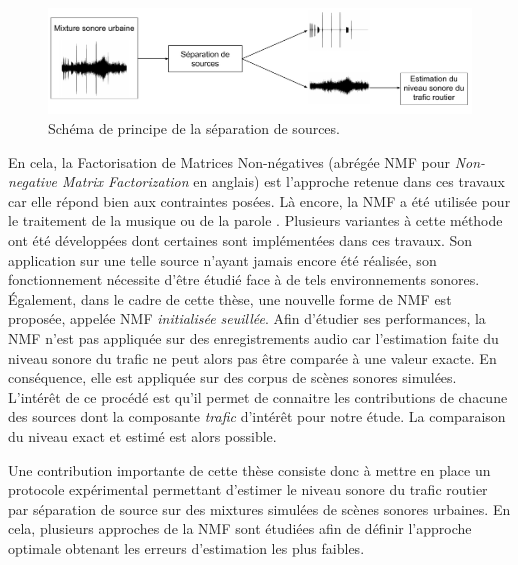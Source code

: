 \begin{figure}[h]
\centering
\includegraphics[width=\linewidth]{./figures/autres/schema_source_separation_FR.pdf}
\caption{Schéma de principe de la séparation de sources.}
\label{fig:separation_source_intro}
\end{figure}


En cela, la Factorisation de Matrices Non-négatives (abrégée NMF pour \textit{Non-negative Matrix Factorization} en anglais) \cite{lee_learning_1999} est l'approche retenue dans ces travaux car elle répond bien aux contraintes posées. Là encore, la NMF a été utilisée pour le traitement de la musique \cite{helen2005separation,fevotte_nonnegative_2009} ou de la parole \cite{wilson2008speech,schmidt2006single}. Plusieurs variantes à cette méthode ont été développées dont certaines sont implémentées dans ces travaux. Son application sur une telle source n'ayant jamais encore été réalisée, son fonctionnement nécessite d'être étudié face à de tels environnements sonores. Également, dans le cadre de cette thèse, une nouvelle forme de NMF est proposée, appelée NMF \textit{initialisée seuillée}.
Afin d'étudier ses performances, la NMF n'est pas appliquée sur des enregistrements audio car l'estimation faite du niveau sonore du trafic ne peut alors pas être comparée à une valeur exacte. En conséquence, elle est appliquée sur des corpus de scènes sonores simulées. L'intérêt de ce procédé est qu'il permet de connaitre les contributions de chacune des sources dont la composante \textit{trafic} d'intérêt pour notre étude. La comparaison du niveau exact et estimé est alors possible.

Une contribution importante de cette thèse consiste donc à mettre en place un protocole expérimental permettant d'estimer le niveau sonore du trafic routier par séparation de source sur des mixtures simulées de scènes sonores urbaines. En cela, plusieurs approches de la NMF sont étudiées afin de définir l'approche optimale obtenant les erreurs d'estimation les plus faibles.


